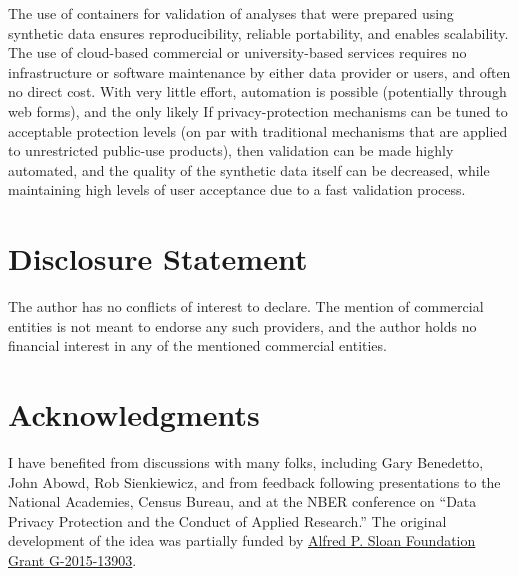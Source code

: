 \documentclass[inline]{hdsr}
\begin{document}
\citep{burman2018,tyagi_privacy-preserving_2024}

\citep{alabi_hypothesis_2022,sheffet_differentially_2019,alabi_differentially_2023,chaudhuri_privacy-preserving_2008,alabi_differentially_2020}

The use of containers for validation of analyses that were prepared using synthetic data ensures reproducibility, reliable portability, and enables scalability. The use of cloud-based commercial or university-based services requires no infrastructure or software maintenance by either data provider or users, and often no direct cost.  With very little effort, automation is possible (potentially through web forms), and the only likely  If   privacy-protection mechanisms can be tuned to acceptable protection levels (on par with traditional mechanisms that are applied to unrestricted public-use products), then validation can be made highly automated, and the quality of the synthetic data itself can be decreased, while maintaining high levels of user acceptance due to a fast validation process.






















\section*{Disclosure Statement}
The author has no conflicts of interest to declare. The mention of commercial entities is not meant to endorse any such providers, and the author holds no financial interest in any of the mentioned commercial entities.

\section*{Acknowledgments}

I have benefited from discussions with many folks, including Gary Benedetto, John Abowd, Rob Sienkiewicz, and from feedback following presentations to the National Academies, Census Bureau, and at the NBER conference on ``Data Privacy Protection and the Conduct of Applied Research.'' The original development of the idea was partially funded by \href{https://sloan.org/grant-detail/6845}{Alfred P. Sloan Foundation Grant G-2015-13903}.
\end{document}
